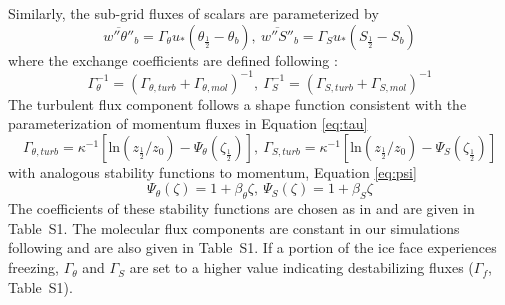 \documentclass[draft]{styles/agujournal2019}
\begin{document}
Similarly, the sub-grid fluxes of scalars are parameterized by
\begin{equation} \label{eq:melt_flux}
    \overline{w''\theta''}_b = \Gamma_{\theta} u_* \left(\theta_{\frac{1}{2}} - \theta_b\right),\: 
    \overline{w''S''}_b = \Gamma_S u_* \left(S_{\frac{1}{2}} - S_b\right)
\end{equation}
%
where the exchange coefficients are defined following :
\begin{equation} \label{eq:gamma}
    \Gamma_{\theta}^{-1} = \left(\Gamma_{\theta,turb} + \Gamma_{\theta,mol}\right)^{-1},\:
    \Gamma_S^{-1} = \left(\Gamma_{S,turb} + \Gamma_{S,mol}\right)^{-1}
\end{equation}
%
The turbulent flux component follows a shape function consistent with the parameterization of momentum fluxes in Equation \ref{eq:tau}
\begin{equation} \label{eq:gamma_turb}
    \Gamma_{\theta,turb} = \kappa^{-1} \left[\textrm{ln}\left(z_{\frac{1}{2}}/z_0\right) - \Psi_{\theta}\left(\zeta_{\frac{1}{2}}\right)\right], \:
    \Gamma_{S,turb} = \kappa^{-1} \left[\textrm{ln}\left(z_{\frac{1}{2}}/z_0\right) - \Psi_S\left(\zeta_{\frac{1}{2}}\right)\right]    %
\end{equation}
with analogous stability functions to momentum, Equation \ref{eq:psi}
\begin{equation}
    \Psi_{\theta}(\zeta) = 1 + \beta_{\theta}\zeta, \:
    \Psi_{S}(\zeta) = 1 + \beta_{S}\zeta
\end{equation}
The coefficients of these stability functions are chosen as in  and are given in Table~S1. The molecular flux components are constant in our simulations following  and are also given in Table~S1. If a portion of the ice face experiences freezing, $\Gamma_\theta$ and $\Gamma_S$ are set to a higher value indicating destabilizing fluxes ($\Gamma_{f}$, Table~S1).
\end{document}
